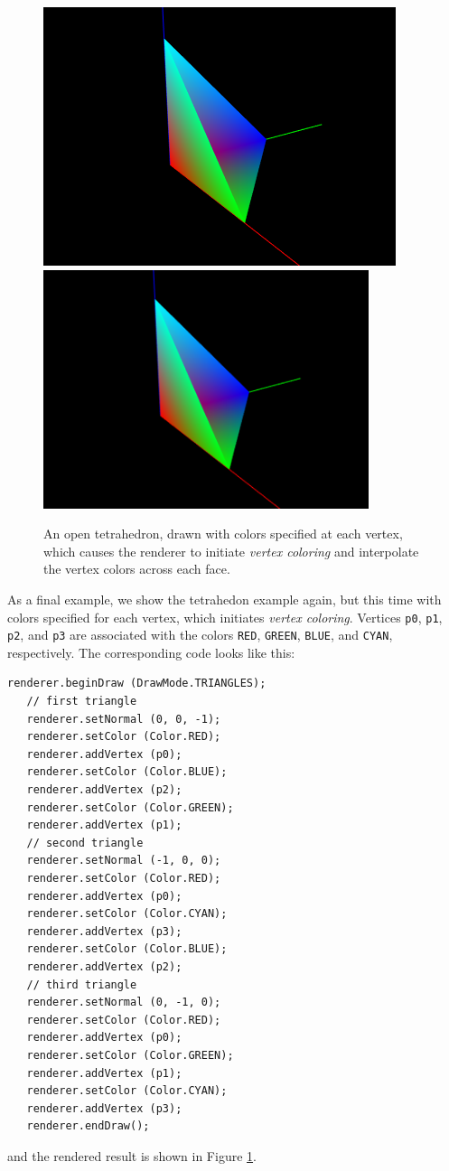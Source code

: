 %
\begin{figure}[t]
\begin{center}
\iflatexml
 \includegraphics[]{images/coloredTet}
\else
 \includegraphics[width=3.75in]{images/coloredTet}
\fi
\end{center}
\caption{An open tetrahedron, drawn with colors specified at
each vertex, which causes the renderer to initiate {\it vertex coloring}
and interpolate the vertex colors across each face.}
\label{coloredTet:fig}
\end{figure}
%

As a final example, we show the tetrahedon example again, but this
time with colors specified for each vertex, which initiates {\it
vertex coloring}.  Vertices {\tt p0}, {\tt p1}, {\tt p2}, and {\tt p3}
are associated with the colors {\tt RED}, {\tt GREEN}, {\tt BLUE}, and
{\tt CYAN}, respectively. The corresponding code looks like this:
%
\begin{lstlisting}[]
   renderer.beginDraw (DrawMode.TRIANGLES);
   // first triangle
   renderer.setNormal (0, 0, -1);
   renderer.setColor (Color.RED);
   renderer.addVertex (p0); 
   renderer.setColor (Color.BLUE);
   renderer.addVertex (p2);
   renderer.setColor (Color.GREEN);
   renderer.addVertex (p1);
   // second triangle
   renderer.setNormal (-1, 0, 0);
   renderer.setColor (Color.RED);
   renderer.addVertex (p0); 
   renderer.setColor (Color.CYAN);
   renderer.addVertex (p3);
   renderer.setColor (Color.BLUE);
   renderer.addVertex (p2);
   // third triangle
   renderer.setNormal (0, -1, 0);
   renderer.setColor (Color.RED);
   renderer.addVertex (p0);
   renderer.setColor (Color.GREEN);
   renderer.addVertex (p1);
   renderer.setColor (Color.CYAN);
   renderer.addVertex (p3);
   renderer.endDraw();
\end{lstlisting}
%
and the rendered result is shown in Figure \ref{coloredTet:fig}.

